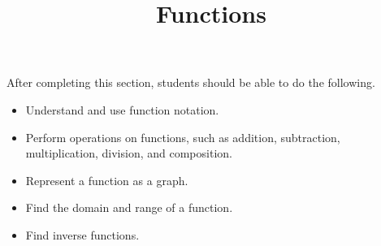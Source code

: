 \documentclass{ximera}
\title{Functions}
\begin{document}
\begin{abstract}
\end{abstract}

\maketitle

\begin{sectionOutcomes}

After completing this section, students should be able to do the following.

\begin{itemize}
	\item Understand and use function notation.
	\item Perform operations on functions, such as addition, subtraction, multiplication, division, and composition.
	\item Represent a function as a graph.
	\item Find the domain and range of a function.
	\item Find inverse functions.
\end{itemize}

\end{sectionOutcomes}
\end{document}
